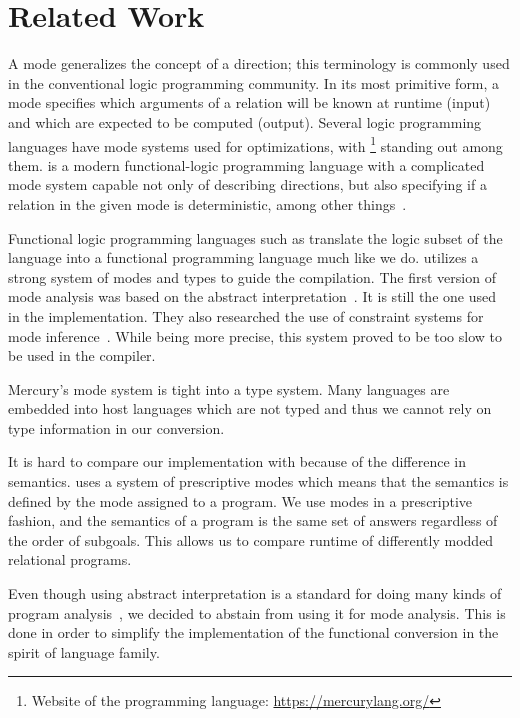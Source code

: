 \section{Related Work}

A mode generalizes the concept of a direction; this terminology is commonly used in the conventional logic programming community.
In its most primitive form, a mode specifies which arguments of a relation will be known at runtime (input) and which are expected to be computed (output).
Several logic programming languages have mode systems used for optimizations, with \merc\footnote{Website of the \merc programming language: \url{https://mercurylang.org/}} standing out among them.
\merc is a modern functional-logic programming language with a complicated mode system capable not only of describing directions, but also specifying if a relation in the given mode is deterministic, among other things~\cite{overton2002constraint}.

Functional logic programming languages such as \merc translate the logic subset of the language into a functional programming language much like we do.
\merc utilizes a strong system of modes and types to guide the compilation.
The first version of mode analysis was based on the abstract interpretation~\cite{somogyi1987system}.
It is still the one used in the implementation.
They also researched the use of constraint systems for mode inference~\cite{overton2002constraint}.
While being more precise, this system proved to be too slow to be used in the compiler.

Mercury's mode system is tight into a type system.
Many \mk languages are embedded into host languages which are not typed and thus we cannot rely on type information in our conversion.

It is hard to compare our implementation with \merc because of the difference in semantics.
\merc uses a system of prescriptive modes which means that the semantics is defined by the mode assigned to a program.
We use modes in a prescriptive fashion, and the semantics of a \mk program is the same set of answers regardless of the order of subgoals.
This allows us to compare runtime of differently modded relational programs.

Even though using abstract interpretation is a standard for doing many kinds of program analysis~\cite{seminal paper}, we decided to abstain from using it for mode analysis.
This is done in order to simplify the implementation of the functional conversion in the spirit of \mk language family.



